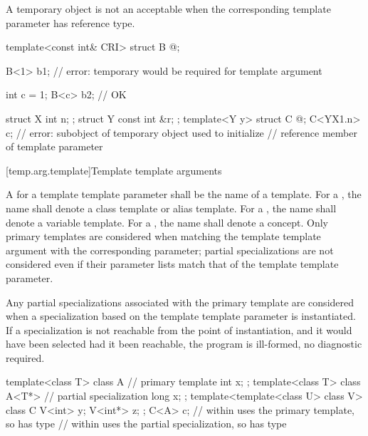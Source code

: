 \pnum
\begin{note}
A temporary object
is not an acceptable
when the corresponding
template parameter
has reference type.
\begin{example}
\begin{codeblock}
template<const int& CRI> struct B { @\commentellip@ };

B<1> b1;                        // error: temporary would be required for template argument

int c = 1;
B<c> b2;                        // OK

struct X { int n; };
struct Y { const int &r; };
template<Y y> struct C { @\commentellip@ };
C<Y{X{1}.n}> c;                 // error: subobject of temporary object used to initialize
                                // reference member of template parameter
\end{codeblock}
\end{example}
\end{note}

[temp.arg.template]{Template template arguments}

\pnum
A
for a template
template parameter
shall be the name of a template.
For a ,
the name shall denote a class template or alias template.
For a ,
the name shall denote a variable template.
For a ,
the name shall denote a concept.
Only primary templates are considered when matching the template template
argument with the corresponding parameter; partial specializations are not
considered even if their parameter lists match that of the template template
parameter.

\pnum
Any partial specializations associated with the
primary template are considered when a
specialization based on the template template parameter is instantiated.
If a specialization is not reachable from the point of instantiation,
and it would have been selected had it been reachable, the program is ill-formed,
no diagnostic required.
\begin{example}
\begin{codeblock}
template<class T> class A {     // primary template
  int x;
};
template<class T> class A<T*> { // partial specialization
  long x;
};
template<template<class U> class V> class C {
  V<int>  y;
  V<int*> z;
};
C<A> c;             //  within  uses the primary template, so  has type 
                    //  within  uses the partial specialization, so  has type 
\end{codeblock}
\end{example}

